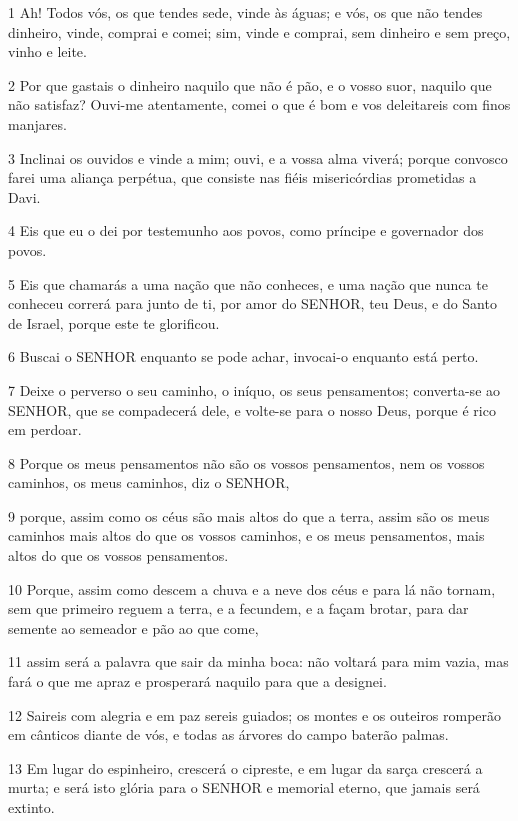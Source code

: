 \par 1 Ah! Todos vós, os que tendes sede, vinde às águas; e vós, os que não tendes dinheiro, vinde, comprai e comei; sim, vinde e comprai, sem dinheiro e sem preço, vinho e leite.
\par 2 Por que gastais o dinheiro naquilo que não é pão, e o vosso suor, naquilo que não satisfaz? Ouvi-me atentamente, comei o que é bom e vos deleitareis com finos manjares.
\par 3 Inclinai os ouvidos e vinde a mim; ouvi, e a vossa alma viverá; porque convosco farei uma aliança perpétua, que consiste nas fiéis misericórdias prometidas a Davi.
\par 4 Eis que eu o dei por testemunho aos povos, como príncipe e governador dos povos.
\par 5 Eis que chamarás a uma nação que não conheces, e uma nação que nunca te conheceu correrá para junto de ti, por amor do SENHOR, teu Deus, e do Santo de Israel, porque este te glorificou.
\par 6 Buscai o SENHOR enquanto se pode achar, invocai-o enquanto está perto.
\par 7 Deixe o perverso o seu caminho, o iníquo, os seus pensamentos; converta-se ao SENHOR, que se compadecerá dele, e volte-se para o nosso Deus, porque é rico em perdoar.
\par 8 Porque os meus pensamentos não são os vossos pensamentos, nem os vossos caminhos, os meus caminhos, diz o SENHOR,
\par 9 porque, assim como os céus são mais altos do que a terra, assim são os meus caminhos mais altos do que os vossos caminhos, e os meus pensamentos, mais altos do que os vossos pensamentos.
\par 10 Porque, assim como descem a chuva e a neve dos céus e para lá não tornam, sem que primeiro reguem a terra, e a fecundem, e a façam brotar, para dar semente ao semeador e pão ao que come,
\par 11 assim será a palavra que sair da minha boca: não voltará para mim vazia, mas fará o que me apraz e prosperará naquilo para que a designei.
\par 12 Saireis com alegria e em paz sereis guiados; os montes e os outeiros romperão em cânticos diante de vós, e todas as árvores do campo baterão palmas.
\par 13 Em lugar do espinheiro, crescerá o cipreste, e em lugar da sarça crescerá a murta; e será isto glória para o SENHOR e memorial eterno, que jamais será extinto.

